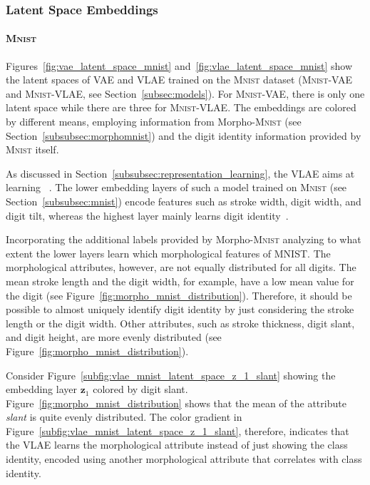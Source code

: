 \subsubsection{Latent Space Embeddings}\label{subsubsec:latent_space_embeddings}

\paragraph{\textsc{Mnist}}

Figures~\ref{fig:vae_latent_space_mnist} and~\ref{fig:vlae_latent_space_mnist} show the latent spaces of \ac{VAE} and \ac{VLAE} trained on the \textsc{Mnist} dataset (\textsc{Mnist}-\ac{VAE} and \textsc{Mnist}-\ac{VLAE}, see Section~\ref{subsec:models}).
For \textsc{Mnist}-\ac{VAE}, there is only one latent space while there are three for \textsc{Mnist}-\ac{VLAE}.
The embeddings are colored by different means, employing information from Morpho-\textsc{Mnist} (see Section~\ref{subsubsec:morphomnist}) and the digit identity information provided by \textsc{Mnist} itself.

As discussed in Section~\ref{subsubsec:representation_learning}, the \ac{VLAE} aims at learning ~\citep{zhao2017learning}.
The lower embedding layers of such a model trained on \textsc{Mnist} (see Section~\ref{subsubsec:mnist}) encode features such as stroke width, digit width, and digit tilt, whereas the highest layer mainly learns digit identity~\citep{zhao2017learning}.

Incorporating the additional labels provided by Morpho-\textsc{Mnist} analyzing to what extent the lower layers learn which morphological features of \textsc{MNIST}.
The morphological attributes, however, are not equally distributed for all digits.
The mean stroke length and the digit width, for example, have a low mean value for the digit  (see Figure~\ref{fig:morpho_mnist_distribution}).
Therefore, it should be possible to almost uniquely identify digit  identity by just considering the stroke length or the digit width.
Other attributes, such as stroke thickness, digit slant, and digit height, are more evenly distributed (see Figure~\ref{fig:morpho_mnist_distribution}).

Consider Figure~\ref{subfig:vlae_mnist_latent_space_z_1_slant} showing the embedding layer $\bm{z}_1$ colored by digit slant.
Figure~\ref{fig:morpho_mnist_distribution} shows that the mean of the attribute \textit{slant} is quite evenly distributed.
The color gradient in Figure~\ref{subfig:vlae_mnist_latent_space_z_1_slant}, therefore, indicates that the VLAE learns the morphological attribute instead of just showing the class identity, encoded using another morphological attribute that correlates with class identity.

